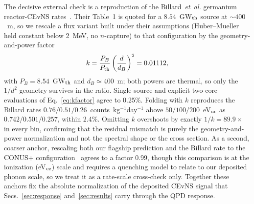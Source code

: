 The decisive external check is a reproduction of the Billard~\emph{et~al.} germanium reactor-CEvNS rates~\cite{billard2017}. Their Table~1 is quoted for a $8.54$~GW$_{\rm th}$ source at $\sim400$~m, so we rescale a flux variant built under their assumptions (Huber--Mueller held constant below 2~MeV, no $n$-capture) to that configuration by the geometry-and-power factor
\begin{equation}
k = \frac{P_B}{P_{\rm th}}\left(\frac{d}{d_B}\right)^2 = 0.01112,
\label{eq:kfactor}
\end{equation}
with $P_B=8.54$~GW$_{\rm th}$ and $d_B\simeq400$~m; both powers are thermal, so only the $1/d^2$ geometry survives in the ratio. Single-source and explicit two-core evaluations of Eq.~\eqref{eq:kfactor} agree to 0.25\%. Folding with $k$ reproduces the Billard rates $0.76/0.51/0.26$~counts~kg$^{-1}$day$^{-1}$ above $50/100/200$~eV$_{\rm nr}$ as $0.742/0.501/0.257$, within 2.4\%. Omitting $k$ overshoots by exactly $1/k=89.9\times$ in every bin, confirming that the residual mismatch is purely the geometry-and-power normalization and not the spectral shape or the cross section. As a second, coarser anchor, rescaling both our flagship prediction and the Billard rate to the CONUS+ configuration~\cite{conus2025} agrees to a factor 0.99, though this comparison is at the ionization (eV$_{\rm ee}$) scale and requires a quenching model to relate to our deposited phonon scale, so we treat it as a rate-scale cross-check only. Together these anchors fix the absolute normalization of the deposited CEvNS signal that Secs.~\ref{sec:response} and~\ref{sec:results} carry through the QPD response.
